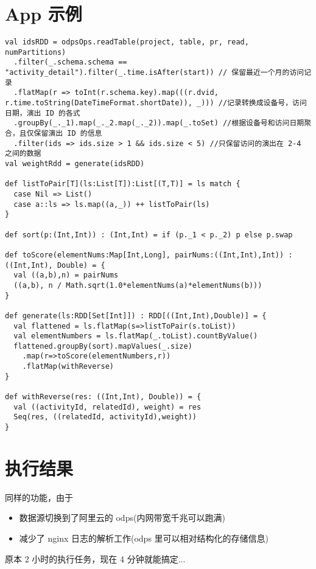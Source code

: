 \documentclass[11pt,a4paper]{article}
\begin{document}
\section*{App 示例}
\label{sec:org9f9ce4c}
\begin{lstlisting}
val idsRDD = odpsOps.readTable(project, table, pr, read, numPartitions)
  .filter(_.schema.schema == "activity_detail").filter(_.time.isAfter(start)) // 保留最近一个月的访问记录
  .flatMap(r => toInt(r.schema.key).map(((r.dvid, r.time.toString(DateTimeFormat.shortDate)), _))) //记录转换成设备号，访问日期，演出 ID 的各式
  .groupBy(_._1).map(_._2.map(_._2)).map(_.toSet) //根据设备号和访问日期聚合，且仅保留演出 ID 的信息
  .filter(ids => ids.size > 1 && ids.size < 5) //只保留访问的演出在 2-4 之间的数据
val weightRdd = generate(idsRDD)

def listToPair[T](ls:List[T]):List[(T,T)] = ls match {
  case Nil => List()
  case a::ls => ls.map((a,_)) ++ listToPair(ls)
}

def sort(p:(Int,Int)) : (Int,Int) = if (p._1 < p._2) p else p.swap

def toScore(elementNums:Map[Int,Long], pairNums:((Int,Int),Int)) : ((Int,Int), Double) = {
  val ((a,b),n) = pairNums
  ((a,b), n / Math.sqrt(1.0*elementNums(a)*elementNums(b)))
}

def generate(ls:RDD[Set[Int]]) : RDD[((Int,Int),Double)] = {
  val flattened = ls.flatMap(s=>listToPair(s.toList))
  val elementNumbers = ls.flatMap(_.toList).countByValue()
  flattened.groupBy(sort).mapValues(_.size)
    .map(r=>toScore(elementNumbers,r))
    .flatMap(withReverse)
}

def withReverse(res: ((Int,Int), Double)) = {
  val ((activityId, relatedId), weight) = res
  Seq(res, ((relatedId, activityId),weight))
}
\end{lstlisting}

\section*{执行结果}
\label{sec:org925a475}
同样的功能，由于
\begin{itemize}
\item 数据源切换到了阿里云的 odps(内网带宽千兆可以跑满)
\item 减少了 nginx 日志的解析工作(odps 里可以相对结构化的存储信息)
\end{itemize}
原本 2 小时的执行任务，现在 4 分钟就能搞定...
\end{document}
